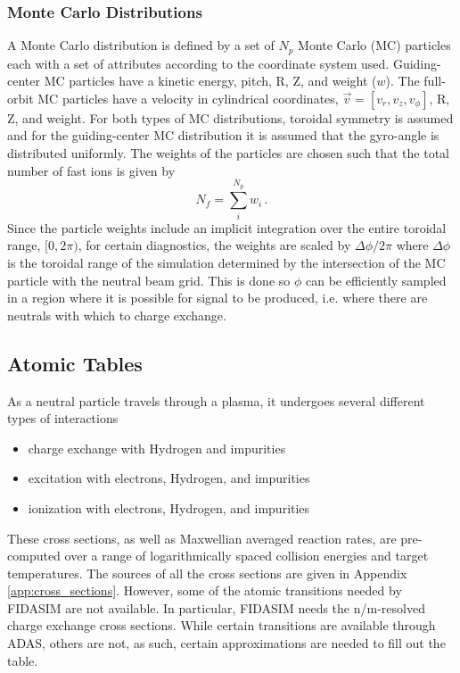 \subsubsection{Monte Carlo Distributions}
A Monte Carlo distribution is defined by a set of $N_p$ Monte Carlo (MC) particles each with a set of attributes according to the coordinate system used. Guiding-center MC particles have a kinetic energy, pitch, R, Z, and weight ($w$). The full-orbit MC particles have a velocity in cylindrical coordinates, $\vec{v} = [v_r,v_z,v_\phi]$, R, Z, and weight.
For both types of MC distributions, toroidal symmetry is assumed and for the guiding-center MC distribution it is assumed that the gyro-angle is distributed uniformly.
The weights of the particles are chosen such that the total number of fast ions is given by
\begin{equation}\label{eq:mc_ntot}
    N_{f} = \sum_i^{N_{p}} w_i \,.
\end{equation}
Since the particle weights include an implicit integration over the entire toroidal range, $[0,2\pi)$, for certain diagnostics, the weights are scaled by $\Delta \phi/2\pi$ where $\Delta \phi$ is the toroidal range of the simulation determined by the intersection of the MC particle with the neutral beam grid. This is done so $\phi$ can be efficiently sampled in a region where it is possible for signal to be produced, i.e. where there are neutrals with which to charge exchange.

\subsection{Atomic Tables}
As a neutral particle travels through a plasma, it undergoes several different types of interactions
\begin{itemize}
    \item charge exchange with Hydrogen and impurities
    \item excitation with electrons, Hydrogen, and impurities
    \item ionization with electrons, Hydrogen, and impurities
\end{itemize}
These cross sections, as well as Maxwellian averaged reaction rates, are pre-computed over a range of logarithmically spaced collision energies and target temperatures. The sources of all the cross sections are given in Appendix \ref{app:cross_sections}. 
However, some of the atomic transitions needed by FIDASIM are not available. In particular, FIDASIM needs the n/m-resolved charge exchange cross sections. While certain transitions are available through ADAS\cite{adas}, others are not, as such, certain approximations are needed to fill out the table.

